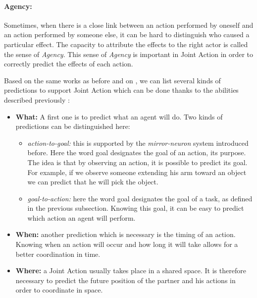 \documentclass[english,a4paper,11pt,twoside]{StyleThese}
\begin{document}
\paragraph{Agency:} Sometimes, when there is a close link between an action performed by oneself and an action performed by someone else, it can be hard to distinguish who caused a particular effect. The capacity to attribute the effects to the right actor is called the sense of \textit{Agency}. This sense of \textit{Agency} is important in Joint Action in order to correctly predict the effects of each action.

\bigskip
Based on the same works as before and on \cite{sebanz2009prediction}, we can list several kinds of predictions to support Joint Action which can be done thanks to the abilities described previously :

\begin{itemize}
\item \textbf{What:} A first one is to predict what an agent will do. Two kinds of predictions can be distinguished here:
\begin{itemize}
\item \textit{action-to-goal:} this is supported by the \textit{mirror-neuron} system introduced before. Here the word goal designates the goal of an action, its purpose. The idea is that by observing an action, it is possible to predict its goal. For example, if we observe someone extending his arm toward an object we can predict that he will pick the object.
\item \textit{goal-to-action:} here the word goal designates the goal of a task, as defined in the previous subsection. Knowing this goal, it can be easy to predict which action an agent will perform.
\end{itemize}
\item \textbf{When:} another prediction which is necessary is the timing of an action. Knowing when an action will occur and how long it will take allows for a better coordination in time.
\item \textbf{Where:} a Joint Action usually takes place in a shared space. It is therefore necessary to predict the future position of the partner and his actions in order to coordinate in space.
\end{itemize} 

\end{document}
